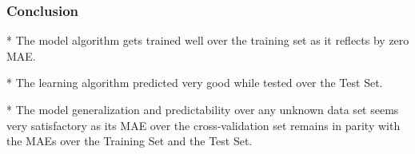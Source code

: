 \documentclass[11pt]{article}
\begin{document}
    \subsubsection{Conclusion}\label{conclusion}
* The model algorithm gets trained well over the training set as it reflects by zero MAE.

* The learning algorithm predicted very good while tested over the Test Set.

* The model generalization and predictability over any unknown data set seems very satisfactory as its MAE over the cross-validation set remains in parity with the MAEs over the Training Set and the Test Set.

    
    
    
    
\end{document}
